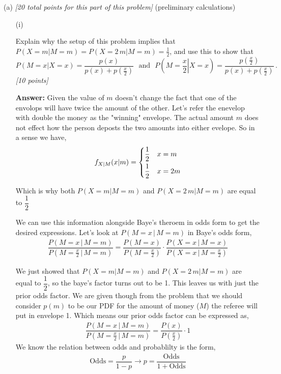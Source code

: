 \documentclass[12pt]{article}
\newcommand{\given}{\, | \,}
\begin{document}
(a) \textit{[20 total points for this part of this problem]} (preliminary calculations)

\begin{itemize}

\item[(i)]%

Explain why the setup of this problem implies that
$P ( X = m | M = m ) = P ( X = 2 \, m | M = m ) = \frac{ 1 }{ 2 }$, and use
this to show that
\begin{equation} \label{e:calculation-1}
P ( M = x | X = x ) = \frac{ p ( x ) }{ p ( x ) + p \! \left( \frac{ x }{
2 } \right) } \ \ \ \mbox{and} \ \ \ P \! \left( M = \left. \frac{ x }{ 2
} \right| X = x \right) = \frac{ p \! \left( \frac{ x }{ 2 } \right) }{ p
( x ) + p \! \left( \frac{ x }{ 2 } \right) } \, .
\end{equation}
\textit{[10 points]}

{\bf Answer:}  Given the value of $m$ doesn't change the fact that one of the envolops will have twice the amount of the other. Let's refer the enevelop with double the money as the "winning" envelope. The actual amount $m$ does not effect how the person deposts the two amounts into either evelope. So in a sense we have,
\begin{align*}
    f_{X|M}(x|m) = \begin{dcases}\dfrac{1}{2} & x = m \\ \dfrac{1}{2} & x = 2m\end{dcases}
\end{align*}

Which is why both $P ( X = m | M = m )$ and $P ( X = 2 \, m | M = m )$ are equal to $\dfrac{1}{2}$

We can use this information alongside Baye's theroem in odds form to get the desired expressions. Let's look at $P(M = x \given M = m)$ in Baye's odds form,
\begin{align*}
    \dfrac{P(M = x \given M = m)}{P(M = \frac{x}{2} \given M = m)} = \dfrac{P(M=x)}{P(M=\frac{x}{2})} \cdot \dfrac{P(X=x\given M = x)}{P(X=x\given M = \frac{x}{2})}
\end{align*}

We just showed that $P ( X = m | M = m )$ and $P ( X = 2 \, m | M = m )$ are equal to $\dfrac{1}{2}$, so the baye's factor turns out to be 1. This leaves us with just the prior odds factor. We are given though from the problem that we should consider $p(m)$ to be our PDF for the amount of money ($M$) the referee will put in envelope 1. Which means our prior odds factor can be expressed as,
\begin{align*}
    \dfrac{P(M = x \given M = m)}{P(M = \frac{x}{2} \given M = m)} = \dfrac{P(x)}{P(\frac{x}{2})} \cdot 1
\end{align*}
We know the relation between odds and probablilty is the form,
\begin{align*}
    \text{Odds} = \dfrac{p}{1-p} \rightarrow p = \dfrac{\text{Odds}}{1 + \text{Odds}}
\end{align*}


\end{itemize}
\end{document}
